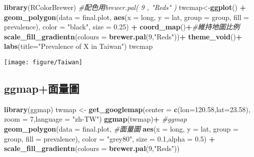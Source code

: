 \documentclass[
]{book}
\newenvironment{Shaded}{\begin{snugshade}}{\end{snugshade}}
\newcommand{\CommentTok}[1]{\textcolor[rgb]{0.56,0.35,0.01}{\textit{#1}}}
\newcommand{\DataTypeTok}[1]{\textcolor[rgb]{0.13,0.29,0.53}{#1}}
\newcommand{\DecValTok}[1]{\textcolor[rgb]{0.00,0.00,0.81}{#1}}
\newcommand{\FloatTok}[1]{\textcolor[rgb]{0.00,0.00,0.81}{#1}}
\newcommand{\KeywordTok}[1]{\textcolor[rgb]{0.13,0.29,0.53}{\textbf{#1}}}
\newcommand{\NormalTok}[1]{#1}
\newcommand{\OperatorTok}[1]{\textcolor[rgb]{0.81,0.36,0.00}{\textbf{#1}}}
\newcommand{\StringTok}[1]{\textcolor[rgb]{0.31,0.60,0.02}{#1}}
\begin{document}
\begin{Shaded}
\begin{Highlighting}[]
\KeywordTok{library}\NormalTok{(RColorBrewer) }\CommentTok{#配色用brewer.pal( 9 , "Reds" )}
\NormalTok{twcmap<-}\KeywordTok{ggplot}\NormalTok{() }\OperatorTok{+}
\StringTok{    }\KeywordTok{geom_polygon}\NormalTok{(}\DataTypeTok{data =}\NormalTok{ final.plot, }
                 \KeywordTok{aes}\NormalTok{(}\DataTypeTok{x =}\NormalTok{ long, }\DataTypeTok{y =}\NormalTok{ lat, }\DataTypeTok{group =}\NormalTok{ group, }
                     \DataTypeTok{fill =}\NormalTok{ prevalence), }
                 \DataTypeTok{color =} \StringTok{"black"}\NormalTok{, }\DataTypeTok{size =} \FloatTok{0.25}\NormalTok{) }\OperatorTok{+}\StringTok{ }
\StringTok{    }\KeywordTok{coord_map}\NormalTok{()}\OperatorTok{+}\CommentTok{#維持地圖比例}
\StringTok{    }\KeywordTok{scale_fill_gradientn}\NormalTok{(}\DataTypeTok{colours =} \KeywordTok{brewer.pal}\NormalTok{(}\DecValTok{9}\NormalTok{,}\StringTok{"Reds"}\NormalTok{))}\OperatorTok{+}
\StringTok{    }\KeywordTok{theme_void}\NormalTok{()}\OperatorTok{+}
\StringTok{    }\KeywordTok{labs}\NormalTok{(}\DataTypeTok{title=}\StringTok{"Prevalence of X in Taiwan"}\NormalTok{)}
\NormalTok{twcmap}
\end{Highlighting}
\end{Shaded}

\texttt{[image: figure/Taiwan]}

\hypertarget{ggmapux9762ux91cfux5716}{%
\subsection{ggmap+面量圖}\label{ggmapux9762ux91cfux5716}}

\begin{Shaded}
\begin{Highlighting}[]
\KeywordTok{library}\NormalTok{(ggmap)}
\NormalTok{twmap <-}\StringTok{ }\KeywordTok{get_googlemap}\NormalTok{(}\DataTypeTok{center =} \KeywordTok{c}\NormalTok{(}\DataTypeTok{lon=}\FloatTok{120.58}\NormalTok{,}\DataTypeTok{lat=}\FloatTok{23.58}\NormalTok{), }
                       \DataTypeTok{zoom =} \DecValTok{7}\NormalTok{,}\DataTypeTok{language =} \StringTok{"zh-TW"}\NormalTok{)}
\KeywordTok{ggmap}\NormalTok{(twmap)}\OperatorTok{+}\StringTok{ }\CommentTok{#ggmap}
\StringTok{    }\KeywordTok{geom_polygon}\NormalTok{(}\DataTypeTok{data =}\NormalTok{ final.plot,  }\CommentTok{#面量圖}
        \KeywordTok{aes}\NormalTok{(}\DataTypeTok{x =}\NormalTok{ long, }\DataTypeTok{y =}\NormalTok{ lat, }\DataTypeTok{group =}\NormalTok{ group, }\DataTypeTok{fill =}\NormalTok{ prevalence), }
        \DataTypeTok{color =} \StringTok{"grey80"}\NormalTok{, }\DataTypeTok{size =} \FloatTok{0.1}\NormalTok{,}\DataTypeTok{alpha =} \FloatTok{0.5}\NormalTok{) }\OperatorTok{+}\StringTok{ }
\KeywordTok{scale_fill_gradientn}\NormalTok{(}\DataTypeTok{colours =} \KeywordTok{brewer.pal}\NormalTok{(}\DecValTok{9}\NormalTok{,}\StringTok{"Reds"}\NormalTok{))}
\end{Highlighting}
\end{Shaded}
\end{document}
